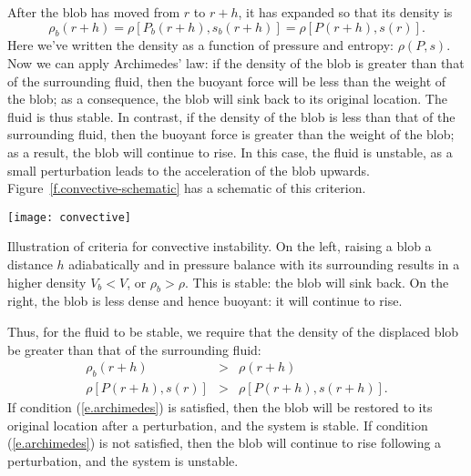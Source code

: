 After the blob has moved from $r$ to $r+h$, it has expanded so that its density is
\[
	\rho_{b}(r+h) = \rho[P_{b}(r+h),s_{b}(r+h)] = \rho[P(r+h),s(r)].
\]
Here we've written the density as a function of pressure and entropy: $\rho(P,s)$. Now we can apply Archimedes' law: if the density of the blob is greater than that of the surrounding fluid, then the buoyant force will be less than the weight of the blob; as a consequence, the blob will sink back to its original location. The fluid is thus stable. In contrast, if the density of the blob is less than that of the surrounding fluid, then the buoyant force is greater than the weight of the blob; as a result, the blob will continue to rise. In this case, the fluid is unstable, as a small perturbation leads to the acceleration of the blob upwards. Figure~\ref{f.convective-schematic} has a schematic of this criterion.
\begin{marginfigure}[-6\baselineskip]
\texttt{[image: convective]}
\caption[Illustration of criteria for convective instability]{\label{f.convective-schematic}Illustration of criteria for convective instability.  On the left, raising a blob a distance $h$ adiabatically and in pressure balance with its surrounding results in a higher density $V_{b} < V$, or $\rho_{b} > \rho$.  This is stable: the blob will sink back.  On the right, the blob is less dense and hence buoyant: it will continue to rise.}
\end{marginfigure}

Thus, for the fluid to be stable, we require that the density of the displaced blob be greater than that of the surrounding fluid:
\begin{eqnarray}
\rho_{b}(r+h) &>& \rho(r+h) \nonumber\\
\rho[P(r+h),s(r)] &>& \rho[P(r+h),s(r+h)].
\label{e.archimedes}
\end{eqnarray}
If condition (\ref{e.archimedes}) is satisfied, then the blob will be restored to its original location after a perturbation, and the system is stable. If condition (\ref{e.archimedes}) is not satisfied, then the blob will continue to rise following a perturbation, and the system is unstable.

